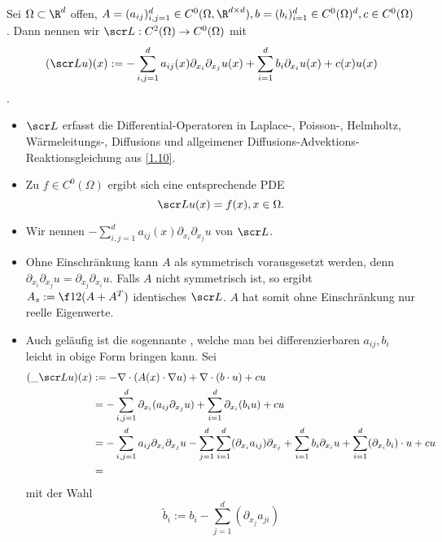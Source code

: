 \begin{df} \label{1.14}
	Sei $\Omega \subset \R^d$ offen, $A = (a_{ij})_{i,j = 1}^d \in C^0 (\Omega, \R^{d\times d}), b = (b_i)_{i=1}^d \in C^0(\Omega)^d, c \in C^0(\Omega)$.
	Dann nennen wir $\scr L: C^2(\Omega) \to C^0(\Omega)$ mit
	\[ \label{eq:1.2}
		(\scr L u)(x) := - \sum_{i,j=1}^d a_{ij}(x) \partial_{x_i} \partial_{x_j} u(x) + \sum_{i=1}^d b_i \partial_{x_i} u(x) + c(x) u(x)
	\]
	.
	\begin{note}
		\begin{itemize}
			\item
				$\scr L$ erfasst die Differential-Operatoren in Laplace-, Poisson-, Helmholtz, Wärmeleitungs-, Diffusions  und allgeimener Diffusions-Advektions-Reaktionsgleichung aus \ref{1.10}.
			\item
				Zu $f \in C^0(\Omega)$ ergibt sich eine entsprechende PDE
				\[ \label{eq:1.3}
					\scr L u(x) = f(x), x \in \Omega.
				\]
			\item
				Wir nennen $-\sum_{i,j=1}^d a_{ij}(x) \partial_{x_i} \partial_{x_j} u$  von $\scr L$.
			\item
				Ohne Einschränkung kann $A$ als symmetrisch vorausgesetzt werden, denn $\partial_{x_i} \partial_{x_j} u = \partial_{x_j} \partial_{x_i} u$.
				Falls $A$ nicht symmetrisch ist, so ergibt $A_s := \f 12 (A + A^T)$ identisches $\scr L$. \Exercise
				$A$ hat somit ohne Einschränkung nur reelle Eigenwerte.
			\item
				Auch geläufig ist die sogennante , welche man bei differenzierbaren $a_{ij}, b_i$ leicht in obige Form bringen kann.
				Sei
				\begin{align*}
					(\_{\scr L} u)(x) &:= - \nabla \cdot (A(x) \cdot \nabla u) + \nabla \cdot (b \cdot u) + c u \\
					&= - \sum_{i,j=1}^d \partial_{x_i} (a_{ij} \partial_{x_j} u) + \sum_{i=1}^d \partial_{x_i} (b_i u) + cu \\
					&= -\sum_{i,j=1}^d a_{ij} \partial_{x_i} \partial_{x_j} u - \sum_{j=1}^d \sum_{i=1}^d (\partial_{x_i} a_{ij}) \partial_{x_j} + \sum_{i=1}^d b_i \partial_{x_i} u + \sum_{i=1}^d (\partial_{x_i} b_i) \cdot u + cu \\
					&= %
				\end{align*}
				mit der Wahl
				\[
					\tilde b_i := b_i - \sum_{j=1}^d (\partial_{x_j} a_{ji})
				\]
		\end{itemize}
	\end{note}
\end{df}

